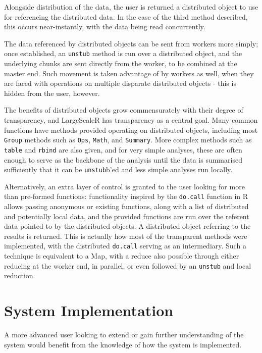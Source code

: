 \documentclass[a4paper,10pt]{article}
\begin{document}
Alongside distribution of the data, the user is returned a distributed object to use for referencing the distributed data.
In the case of the third method described, this occurs near-instantly, with the data being read concurrently.

The data referenced by distributed objects can be sent from workers more simply; once established, an \texttt{unstub} method is run over a distributed object, and the underlying chunks are sent directly from the worker, to be combined at the master end.
Such movement is taken advantage of by workers as well, when they are faced with operations on multiple disparate distributed objects - this is hidden from the user, however.

The benefits of distributed objects grow commensurately with their degree of transparency, and LargeScaleR has transparency as a central goal.
Many common functions have methods provided operating on distributed objects, including most \texttt{Group} methods such as \texttt{Ops}, \texttt{Math}, and \texttt{Summary}.
More complex methods such as \texttt{table} and \texttt{rbind} are also given, and for very simple analyses, these are often enough to serve as the backbone of the analysis until the data is summarised sufficiently that it can be \texttt{unstub}b'ed and less simple analyses run locally.

Alternatively, an extra layer of control is granted to the user looking for more than pre-formed functions:
functionality inspired by the \texttt{do.call} function in R allows passing anonymous or existing functions, along with a list of distributed and potentially local data, and the provided functions are run over the referent data pointed to by the distributed objects.
A distributed object referring to the results is returned.
This is actually how most of the transparent methods were implemented, with the distributed \texttt{do.call} serving as an intermediary.
Such a technique is equivalent to a Map, with a reduce also possible through either reducing at the worker end, in parallel, or even followed by an \texttt{unstub} and local reduction.

\section{System Implementation}\label{sec:sys-imp}

A more advanced user looking to extend or gain further understanding of the system would benefit from the knowledge of how the system is implemented.
\end{document}
